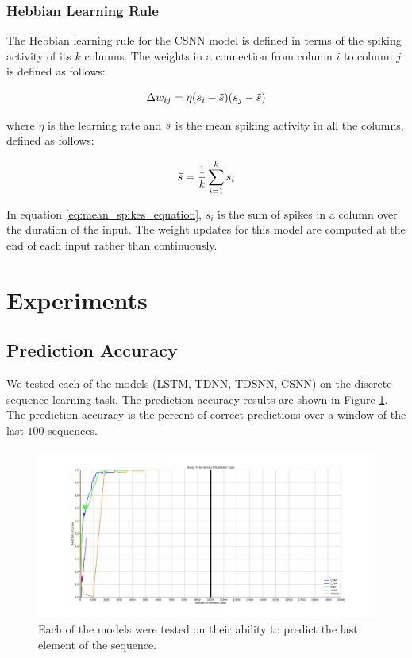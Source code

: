 \documentclass{article}
\begin{document}
\subsubsection*{Hebbian Learning Rule}
The Hebbian learning rule for the CSNN model is defined in terms of the spiking activity of its $k$ columns. The weights in a connection from column $i$ to column $j$ is defined as follows:

\begin{equation}
    \Delta w_{ij} = \eta(s_{i} - \Tilde{s})(s_{j} -  \Tilde{s})
\end{equation}

where $\eta$ is the learning rate and $\Tilde{s}$ is the mean spiking activity in all the columns, defined as follows:

\begin{equation}
    \Tilde{s} = \frac{1}{k} \sum_{i = 1}^{k}{s_i}
    \label{eq:mean_spikes_equation}
\end{equation}

In equation \ref{eq:mean_spikes_equation}, $s_i$ is the sum of spikes in a column over the duration of the input. The weight updates for this model are computed at the end of each input rather than continuously.


\section*{Experiments}

\subsection*{Prediction Accuracy}

We tested each of the models (LSTM, TDNN, TDSNN, CSNN) on the discrete sequence learning task. The prediction accuracy results are shown in Figure \ref{fig:prediction-accuracy}. The prediction accuracy is the percent of correct predictions over a window of the last $100$ sequences.

\begin{figure}[!h]
    \centering
    \includegraphics[width=0.9\linewidth]{../results/artificial.png}
    \caption{Each of the models were tested on their ability to predict the last element of the sequence.}
    \label{fig:prediction-accuracy}
\end{figure}
\end{document}
